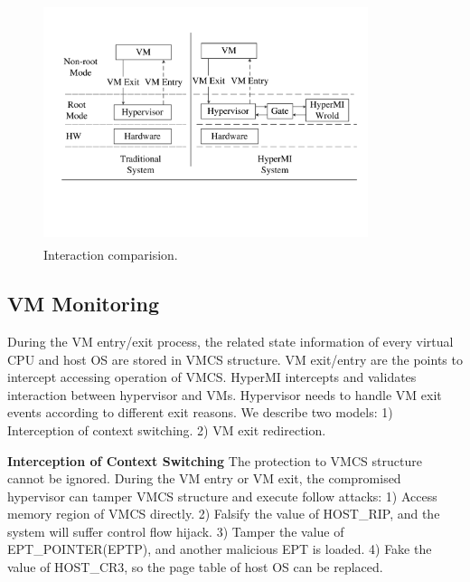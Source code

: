 \documentclass[conference]{IEEEtran}
\begin{document}
\fi


\begin{figure}
\centerline{\includegraphics[width=9.5cm, height=7cm]{pdfvmcsProcess.pdf}}
\caption{Interaction comparision. } \label{fig+1}
\end{figure}


\subsection{VM Monitoring}\label{vmmonitor}

During the VM entry/exit process, the related state information of every virtual CPU and host OS are stored in VMCS structure. 
VM exit/entry are the points to intercept accessing operation of VMCS. HyperMI intercepts and validates interaction between hypervisor and VMs. Hypervisor needs to handle VM exit events according to different exit reasons.
We describe two models: 1) Interception of context switching. 2) VM exit redirection.

\textbf{Interception of Context Switching}
The protection to VMCS structure cannot be ignored.
During the VM entry or VM exit, the compromised hypervisor can tamper VMCS structure and execute follow attacks: 1) Access memory region of VMCS directly. 2) Falsify the value of HOST\_RIP, and the system will suffer control flow hijack. 3) Tamper the value of EPT\_POINTER(EPTP), and another malicious EPT is loaded. 4) Fake the value of HOST\_CR3, so the page table of host OS can be replaced.
\end{document}
